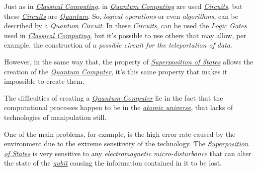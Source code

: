 \documentclass[conference]{IEEEtran}
\begin{document}
\vspace{4pt}

Just as in \href{https://en.wikipedia.org/wiki/Von_Neumann_architecture}{\textit{Classical Computing}}, in \href{https://en.wikipedia.org/wiki/Quantum_computing}{\textit{Quantum Computing}} are used \href{https://en.wikipedia.org/wiki/Circuit}{\textit{Circuits}}, but these \href{https://en.wikipedia.org/wiki/Circuit}{\textit{Circuits}} are \href{https://en.wikipedia.org/wiki/Quantum}{\textit{Quantum}}. So, \textit{logical operations} or even \textit{algorithms}, can be described by a \href{https://en.wikipedia.org/wiki/Quantum_circuit}{\textit{Quantum Circuit}}. In these \href{https://en.wikipedia.org/wiki/Circuit}{\textit{Circuits}}, can be used the \href{https://en.wikipedia.org/wiki/Logic_gate}{\textit{Logic Gates}} used in \href{https://en.wikipedia.org/wiki/Von_Neumann_architecture}{\textit{Classical Computing}}, but it's possible to use others that may allow, per example, the construction of a \textit{possible circuit for the teleportation of data}.

\vspace{4pt}

However, in the same way that, the property of \href{https://en.wikipedia.org/wiki/Quantum_superposition}{\textit{Superposition of States}} allows the creation of the \href{https://en.wikipedia.org/wiki/Quantum_computing}{\textit{Quantum Computer}}, it's this same property that makes it impossible to create them.

\newpage

The difficulties of creating a \href{https://en.wikipedia.org/wiki/Quantum_computing}{\textit{Quantum Computer}} lie in the fact that the computational processes happen to be in the \href{https://en.wikipedia.org/wiki/Atom}{\textit{atomic universe}}, that lacks of technologies of manipulation still. 

\vspace{4pt}

One of the main problems, for example, is the high error rate caused by the environment due to the extreme sensitivity of the technology. The \href{https://en.wikipedia.org/wiki/Quantum_superposition}{\textit{Superposition of States}} is very sensitive to any \textit{electromagnetic micro-disturbance} that can alter the state of the \href{https://en.wikipedia.org/wiki/Qubit}{\textit{qubit}} causing the information contained in it to be lost.

\vspace{4pt}
\end{document}
